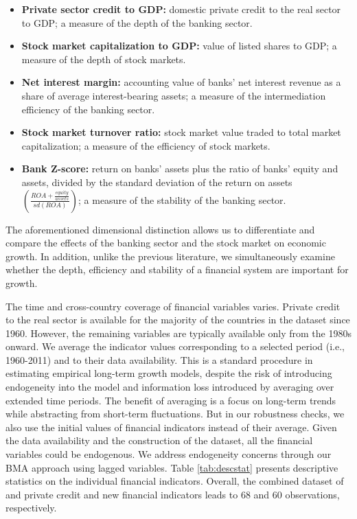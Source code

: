 \begin{refsection}
\begin{itemize}
	\item \textbf{Private sector credit to GDP:} domestic private credit to the real sector to GDP; a measure of the depth of the banking sector.
	\item \textbf{Stock market capitalization to GDP:} value of listed shares to GDP; a measure of the depth of stock markets.
	\item \textbf{Net interest margin:} accounting value of banks' net interest revenue as a share of average interest-bearing assets; a measure of the intermediation efficiency of the banking sector.
	\item \textbf{Stock market turnover ratio:} stock market value traded to total market capitalization; a measure of the efficiency of stock markets.
	\item \textbf{Bank Z-score:} return on banks' assets plus the ratio of banks' equity and assets, divided by the standard deviation of the return on assets $\left(\frac{ROA + \frac{equity}{assets}}{sd(ROA)}\right)$; a measure of the stability of the banking sector.
\end{itemize} 
%
The aforementioned dimensional distinction allows us to differentiate and compare the effects of the banking sector and the stock market on economic growth. In addition, unlike the previous literature, we simultaneously examine whether the depth, efficiency and stability of a financial system are important for growth. 

The time and cross-country coverage of financial variables varies. Private credit to the real sector is available for the majority of the countries in the dataset since 1960. However, the remaining variables are typically available only from the 1980s onward. We average the indicator values corresponding to a selected period (i.e., 1960-2011) and to their data availability. This is a standard procedure in estimating empirical long-term growth models, despite the risk of introducing endogeneity into the model and information loss introduced by averaging over extended time periods. The benefit of averaging is a focus on long-term trends while abstracting from short-term fluctuations. But in our robustness checks, we also use the initial values of financial indicators instead of their average. Given the data availability and the construction of the dataset, all the financial variables could be endogenous. We address endogeneity concerns through our \ac{BMA} approach using lagged variables. Table \ref{tab:descstat} presents descriptive statistics on the individual financial indicators. Overall, the combined dataset of \textcite{Fernandezetal2001} and private credit and new financial indicators leads to 68 and 60 observations, respectively.


\end{refsection}
